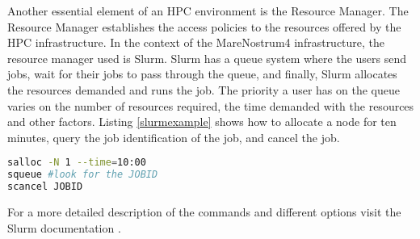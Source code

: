 Another essential element of an HPC environment is the Resource Manager. The Resource Manager establishes the access policies to the resources offered by the HPC infrastructure. In the context of the MareNostrum4 infrastructure, the resource manager used is Slurm\cite{slurm}.  Slurm has a queue system where the users send jobs, wait for their jobs to pass through the queue, and finally, Slurm allocates the resources demanded and runs the job.
The priority a user has on the queue varies on the number of resources required, the time demanded with the resources and other factors. Listing \ref{slurmexample} shows how to allocate a node for ten minutes, query the job identification of the job, and cancel the job.

\begin{lstlisting}[language=sh, caption={Example of slurm usage.}, label={slurmexample}]
salloc -N 1 --time=10:00
squeue #look for the JOBID
scancel JOBID
\end{lstlisting}

For a more detailed description of the commands and different options visit the Slurm documentation \cite{slurmdocu}.





